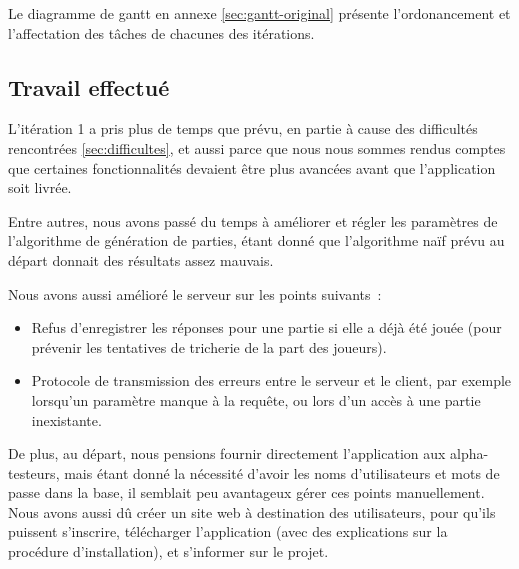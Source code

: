 \documentclass[a4paper,11pt,french]{article}
\begin{document}
Le diagramme de gantt en annexe \ref{sec:gantt-original} présente l'ordonancement et l'affectation des tâches de chacunes des itérations.

\subsection{Travail effectué}

L'itération 1 a pris plus de temps que prévu, en partie à cause des difficultés rencontrées \ref{sec:difficultes}, et aussi parce que nous
nous sommes rendus comptes que certaines fonctionnalités devaient être plus avancées avant que l'application soit livrée.

Entre autres, nous avons passé du temps à améliorer et régler les paramètres de l'algorithme de génération de parties, étant donné que
l'algorithme naïf prévu au départ donnait des résultats assez mauvais.

Nous avons aussi amélioré le serveur sur les points suivants~:
\begin{itemize}
\item Refus d'enregistrer les réponses pour une partie si elle a déjà été jouée (pour prévenir les tentatives de tricherie de la part des joueurs).
\item Protocole de transmission des erreurs entre le serveur et le client, par exemple lorsqu'un paramètre manque à la requête, ou lors d'un
  accès à une partie inexistante.
\end{itemize}

De plus, au départ, nous pensions fournir directement l'application aux alpha-testeurs, mais étant donné la nécessité d'avoir les noms d'utilisateurs
et mots de passe dans la base, il semblait peu avantageux gérer ces points manuellement. Nous avons aussi dû créer un site web à destination
des utilisateurs, pour qu'ils puissent s'inscrire, télécharger l'application (avec des explications sur la procédure d'installation), et
s'informer sur le projet.
\end{document}
